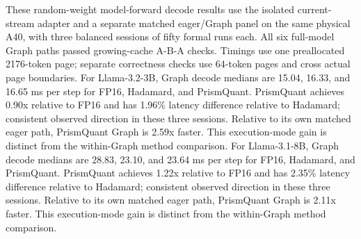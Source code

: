These random-weight model-forward decode results use the isolated current-stream adapter and a separate matched eager/Graph panel on the same physical A40, with three balanced sessions of fifty formal runs each. All six full-model Graph paths passed growing-cache A-B-A checks. Timings use one preallocated 2176-token page; separate correctness checks use 64-token pages and cross actual page boundaries. For Llama-3.2-3B, Graph decode medians are 15.04, 16.33, and 16.65 ms per step for FP16, Hadamard, and PrismQuant. PrismQuant achieves 0.90x relative to FP16 and has 1.96\% latency difference relative to Hadamard; consistent observed direction in these three sessions. Relative to its own matched eager path, PrismQuant Graph is 2.59x faster. This execution-mode gain is distinct from the within-Graph method comparison. For Llama-3.1-8B, Graph decode medians are 28.83, 23.10, and 23.64 ms per step for FP16, Hadamard, and PrismQuant. PrismQuant achieves 1.22x relative to FP16 and has 2.35\% latency difference relative to Hadamard; consistent observed direction in these three sessions. Relative to its own matched eager path, PrismQuant Graph is 2.11x faster. This execution-mode gain is distinct from the within-Graph method comparison.
